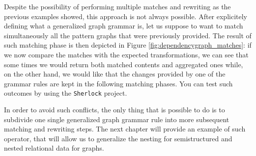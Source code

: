 \begin{example}
Despite the possibility of performing multiple matches and rewriting as the previous examples showed, this approach is not always possible. After explicitely defining what a generalized graph grammar is, let us suppose to want to match simultaneously all the pattern graphs that were previously provided. The result of such matching phase is then depicted in Figure \ref{fig:dependencygraph_matches}: if we now compare the matches with the expected transformations, we can see that some times we would return both matched contents and aggregated ones while, on the other hand, we would like that the changes provided by one of the grammar rules are kept in the following matching phases. You can test such outcomes by using the \texttt{Sherlock} project.

In order to avoid such conflicts, the only thing that is possible to do is to subdivide one single generalized graph grammar rule into more subsequent matching and rewriting steps. The next chapter will provide an example of such operator, that will allow us to generalize the nesting for semistructured and nested relational data for graphs. 
\end{example}
